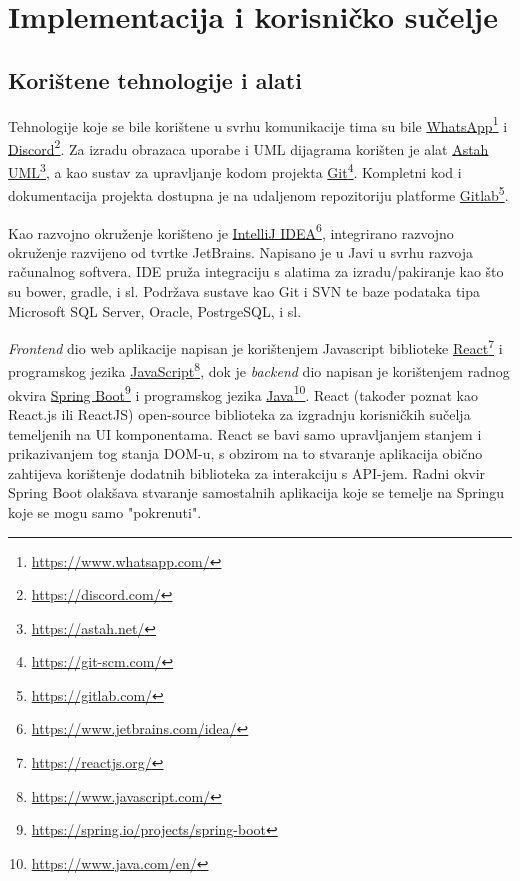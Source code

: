 \chapter{Implementacija i korisničko sučelje}
		
		
		\section{Korištene tehnologije i alati}
		
%			
			
			Tehnologije koje se bile korištene u svrhu komunikacije tima su bile \underline{WhatsApp}\footnote{\url{https://www.whatsapp.com/}} i \underline{Discord}\footnote{\url{https://discord.com/}}. Za izradu obrazaca uporabe i UML dijagrama korišten je alat \underline{Astah UML}\footnote{\url{https://astah.net/}}, a kao sustav za upravljanje kodom projekta \underline{Git}\footnote{\url{https://git-scm.com/}}. Kompletni kod i dokumentacija projekta dostupna je na udaljenom repozitoriju platforme \underline{Gitlab}\footnote{\url{https://gitlab.com/}}.
			
			Kao razvojno okruženje korišteno je \underline{IntelliJ IDEA}\footnote{\url{https://www.jetbrains.com/idea/}}, integrirano razvojno okruženje razvijeno od tvrtke JetBrains. Napisano je u Javi u svrhu razvoja računalnog softvera. IDE pruža integraciju s alatima za izradu/pakiranje kao što su bower, gradle, i sl. Podržava sustave kao Git i SVN te baze podataka tipa Microsoft SQL Server, Oracle, PostrgeSQL, i sl.
			
			\textit{Frontend} dio web aplikacije napisan je korištenjem Javascript biblioteke \underline{React}\footnote{\url{https://reactjs.org/}} i programskog jezika \underline{JavaScript}\footnote{\url{https://www.javascript.com/}}, dok je \textit{backend} dio napisan je korištenjem radnog okvira \underline{Spring Boot}\footnote{\url{https://spring.io/projects/spring-boot}} i programskog jezika \underline{Java}\footnote{\url{https://www.java.com/en/}}. React (također poznat kao React.js ili ReactJS) open-source biblioteka za izgradnju korisničkih sučelja temeljenih na UI komponentama. React se bavi samo upravljanjem stanjem i prikazivanjem tog stanja DOM-u, s obzirom na to stvaranje aplikacija obično zahtijeva korištenje dodatnih biblioteka za interakciju s API-jem. Radni okvir Spring Boot olakšava stvaranje samostalnih aplikacija koje se temelje na Springu koje se mogu samo "pokrenuti".
			
